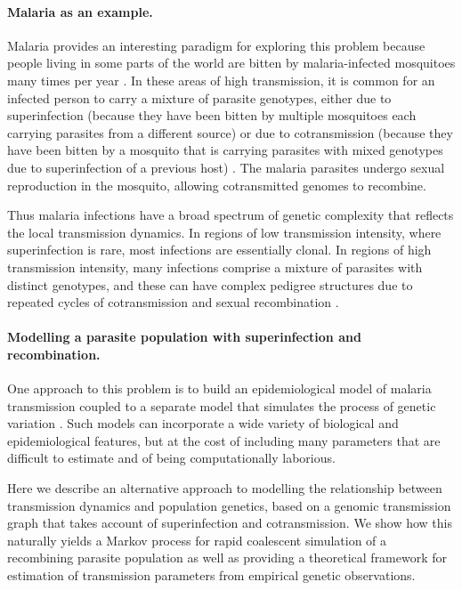 \documentclass[_main.tex]{subfiles}
\begin{document}
\paragraph{Malaria as an example.} 

Malaria provides an interesting paradigm for exploring this problem because people living in some parts of the world are bitten by malaria-infected mosquitoes many times per year \cite{Smith2005,WHO2022}.  In these areas of high transmission, it is common for an infected person to carry a mixture of parasite genotypes, either due to superinfection (because they have been bitten by multiple mosquitoes each carrying parasites from a different source) or due to cotransmission (because they have been bitten by a mosquito that is carrying parasites with mixed genotypes due to superinfection of a previous host) \cite{Nkhoma2020}.  The malaria parasites undergo sexual reproduction in the mosquito, allowing cotransmitted genomes to recombine.

Thus malaria infections have a broad spectrum of genetic complexity that reflects the local transmission dynamics.  In regions of low transmission intensity, where superinfection is rare, most infections are essentially clonal.  In regions of high transmission intensity, many infections comprise a mixture of parasites with distinct genotypes, and these can have complex pedigree structures due to repeated cycles of cotransmission and sexual recombination \cite{Nkhoma2020}. 

\paragraph{Modelling a parasite population with superinfection and recombination.} 

One approach to this problem is to build an epidemiological model of malaria transmission coupled to a separate model that simulates the process of genetic variation \cite{Daniels2015,Watson2020,Hendry2021}.  Such models can incorporate a wide variety of biological and epidemiological features, but at the cost of including many parameters that are difficult to estimate and of being computationally laborious.  

Here we describe an alternative approach to modelling the relationship between transmission dynamics and population genetics, based on a genomic transmission graph that takes account of superinfection and cotransmission.  We show how this naturally yields a Markov process for rapid coalescent simulation of a recombining parasite population as well as providing a theoretical framework for estimation of transmission parameters from empirical genetic observations.  
\end{document}
